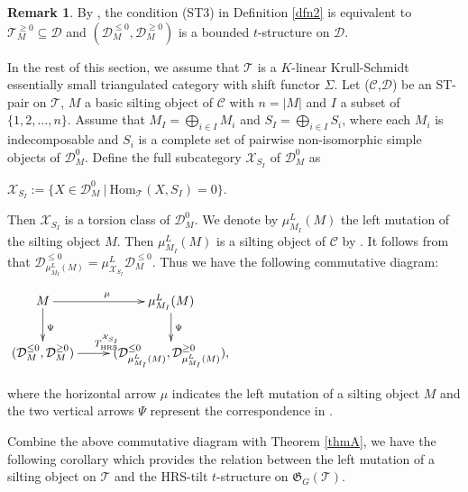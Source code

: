 \documentclass[11pt,a4paper]{amsart}
\numberwithin{equation}{section} \theoremstyle{plain}
\numberwithin{equation}{section} \theoremstyle{definition}
\newtheorem{rem}[lem]{Remark}
\newenvironment{rmk}{\begin{rem}\rm}{\end{rem}}
\begin{document}
\begin{rmk}\label{rmk1} By \cite[Remark 4.5]{AMY}, the condition (ST3) in Definition \ref{dfn2} is equivalent to $\mathcal{T}_{M}^{\geq0}\subseteq\mathcal{D}$ and $(\mathcal{D}_{M}^{\leq0},\mathcal{D}_{M}^{\geq0})$ is a bounded $t$-structure on $\mathcal{D}$.
\end{rmk}


In the rest of this section, we assume that $\mathcal{T}$ is a $K$-linear Krull-Schmidt essentially small triangulated category with shift functor $\Sigma$. Let ($\mathcal{C}$,$\mathcal{D}$) be an ST-pair on $\mathcal{T}$, $M$ a basic silting object of $\mathcal{C}$ with $n=|M|$ and $I$ a subset of $\{1,2,\ldots,n\}$. Assume that $M_{I}=\bigoplus_{i\in I}M_{i}$ and $S_{I}=\bigoplus_{i\in I}S_{i}$, where each $M_{i}$ is indecomposable and $S_{i}$ is a complete set of pairwise non-isomorphic simple objects of $\mathcal{D}_{M}^{0}$. Define the full subcategory $\mathcal{X}_{S_{I}}$ of $\mathcal{D}_{M}^{0}$ as
\begin{center}
$\mathcal{X}_{S_{I}}:=\{X\in\mathcal{D}_{M}^{0}~|~\mathrm{Hom}_{\mathcal{T}}(X,S_{I})=0\}$.
\end{center}
Then $\mathcal{X}_{S_{I}}$ is a torsion class of $\mathcal{D}_{M}^{0}$. We denote by $\mu_{M_{I}}^{L}(M)$ the left mutation of the silting object $M$. Then $\mu_{M_{I}}^{L}(M)$ is a silting object of $\mathcal{C}$ by \cite[Theorem 2.31]{AI}. It follows from \cite[Proposition 7.7]{AMY} that $\mathcal{D}_{\mu_{M_{I}}^{L}(M)}^{\leq0}=\mathcal{\mu}_{\mathcal{X}_{S_{I}}}^{L}\mathcal{D}_{M}^{\leq0}$. Thus we have the following commutative diagram:
\begin{center} $\xymatrix@C=25pt@R=20pt{
M\ar[d]^{\Psi}\ar[r]^{\mu} &\mu_{M_{I}}^{L}(M)\ar[d]^{\Psi}&\\
(\mathcal{D}_{M}^{\leq0},\mathcal{D}_{M}^{\geq0})\ar[r]^{T_{\mathrm{HRS}}^{\mathcal{X}_{S_{I}}}}& (\mathcal{D}_{\mu_{M_{I}}^{L}(M)}^{\leq0},\mathcal{D}_{\mu_{M_{I}}^{L}(M)}^{\geq0}),&}$
\end{center}where the horizontal arrow $\mu$ indicates the left mutation of a silting object $M$ and the two vertical arrows $\Psi$ represent the correspondence in \cite[Theorem 5.5]{AMY}.

Combine the above commutative diagram with Theorem \ref{thmA}, we have the following corollary which provides the relation between the left mutation of a silting object on $\mathcal{T}$ and the HRS-tilt $t$-structure on $\mathfrak{G}_{G}(\mathcal{T})$.
\end{document}
